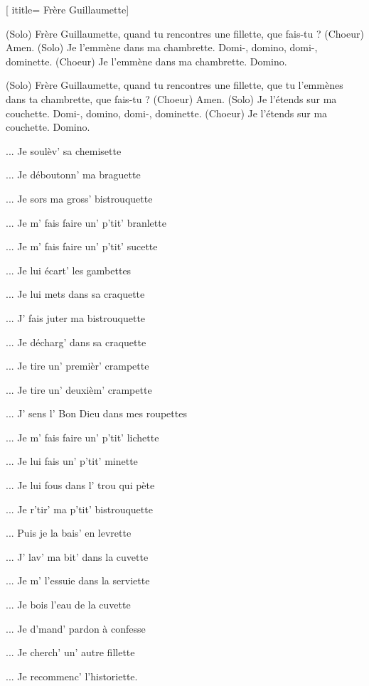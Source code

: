  [
ititle= {Frère Guillaumette}]

\beginverse
(Solo) 	Frère Guillaumette, quand tu rencontres une fillette, que fais-tu ?
(Choeur) 	Amen.
(Solo) 	Je l'emmène dans ma chambrette. Domi-, domino, domi-, dominette.
(Choeur) 	Je l'emmène dans ma chambrette. Domino.
\endverse

\beginverse
(Solo) 	Frère Guillaumette, quand tu rencontres une fillette,
		que tu l'emmènes dans ta chambrette, que fais-tu ?
(Choeur) 	Amen.
(Solo) 	Je l'étends sur ma couchette. Domi-, domino, domi-, dominette.
(Choeur) 	Je l'étends sur ma couchette. Domino.
\endverse

\beginverse
... Je soulèv' sa chemisette
\endverse

\beginverse
... Je déboutonn' ma braguette
\endverse

\beginverse
... Je sors ma gross' bistrouquette
\endverse

\beginverse
... Je m' fais faire un' p'tit' branlette
\endverse

\beginverse
... Je m' fais faire un' p'tit' sucette
\endverse

\beginverse
... Je lui écart' les gambettes
\endverse

\beginverse
... Je lui mets dans sa craquette
\endverse

\beginverse
... J' fais juter ma bistrouquette
\endverse

\beginverse
... Je décharg' dans sa craquette
\endverse

\beginverse
... Je tire un' premièr' crampette
\endverse

\beginverse
... Je tire un' deuxièm' crampette
\endverse

\beginverse
... J' sens l' Bon Dieu dans mes roupettes
\endverse

\beginverse
... Je m' fais faire un' p'tit' lichette
\endverse

\beginverse
... Je lui fais un' p'tit' minette
\endverse

\beginverse
... Je lui fous dans l' trou qui pète
\endverse

\beginverse
... Je r'tir' ma p'tit' bistrouquette
\endverse

\beginverse
... Puis je la bais' en levrette
\endverse

\beginverse
... J' lav' ma bit' dans la cuvette
\endverse

\beginverse
... Je m' l'essuie dans la serviette
\endverse

\beginverse
... Je bois l'eau de la cuvette
\endverse

\beginverse
... Je d'mand' pardon à confesse
\endverse

\beginverse
... Je cherch' un' autre fillette
\endverse

\beginverse
... Je recommenc' l'historiette.
\endverse

\endsong